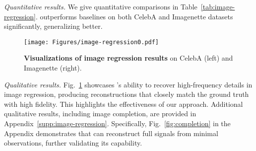 
\emph{Quantitative results.}
We give quantitative comparisons in Table~\ref{tab:image-regression}.
\name{} outperforms baselines on both CelebA and Imagenette datasets significantly, generalizing better. 

\begin{figure}[t]
    \centering
    \begin{minipage}[b]{0.49\textwidth} 
        \texttt{[image: Figures/image-regression0.pdf]} %
        \caption{\textbf{Visualizations of image regression results} on CelebA (left) and Imagenette (right).}
        \label{fig:visualization-image-regression}
    \end{minipage}
\end{figure}


\emph{Qualitative results.} Fig.~\ref{fig:visualization-image-regression} showcases \name{}'s ability to recover high-frequency details in image regression, producing reconstructions that closely match the ground truth with high fidelity. This highlights the effectiveness of our approach. Additional qualitative results, including image completion, are provided in Appendix~\ref{supp:image-regression}. Specifically, Fig.~\ref{fig:completion} in the Appendix demonstrates that \name{} can reconstruct full signals from minimal observations, further validating its capability.


